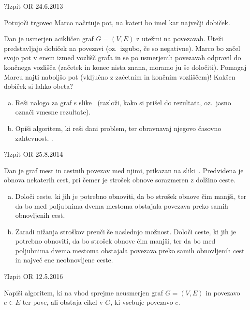 \begin{naloga}{?}{Izpit OR 24.6.2013}
\begin{vprasanje}[marco]
Potujoči trgovec Marco načrtuje pot, na kateri bo imel kar največji dobiček.

Dan je usmerjen acikličen graf $G = (V, E)$ z utežmi na povezavah.
Uteži predstavljajo dobiček na povezavi (oz.~izgubo, če so negativne).
Marco bo začel svojo pot v enem izmed vozlišč grafa
in se po usmerjenih povezavah odpravil do končnega vozlišča
(začetek in konec nista znana, moramo ju še določiti).
Pomagaj Marcu najti naboljšo pot (vključno z začetnim in končnim vozliščem)!
Kakšen dobiček si lahko obeta?

\begin{enumerate}[(a)]
\item Reši nalogo za graf s slike~\fig{}
(razloži, kako si prišel do rezultata, oz.~jasno označi vmesne rezultate).

\item Opiši algoritem, ki reši dani problem,
ter obravnavaj njegovo časovno zahtevnost.
.
\end{enumerate}

\begin{slika}
\pgfslika
{}
\end{slika}
\end{vprasanje}
\begin{odgovor}
\end{odgovor}
\end{naloga}


\begin{naloga}{?}{Izpit OR 25.8.2014}
\begin{vprasanje}[obnova]
Dan je graf mest in cestnih povezav med njimi, prikazan na sliki~\fig{}.
Predvidena je obnova nekaterih cest,
pri čemer je strošek obnove sorazmeren z dolžino ceste.

\begin{enumerate}[(a)]
\item Določi ceste, ki jih je potrebno obnoviti,
da bo strošek obnove čim manjši,
ter da bo med poljubnima dvema mestoma
obstajala povezava preko samih obnovljenih cest.

\item Zaradi nižanja stroškov preuči še naslednjo možnost.
Določi ceste, ki jih je potrebno obnoviti, da bo strošek obnove čim manjši,
ter da bo med poljubnima dvema mestoma obstajala povezava
preko samih obnovljenih cest in največ ene neobnovljene ceste.
\end{enumerate}

\begin{slika}
\pgfslika
{}
\end{slika}
\end{vprasanje}
\begin{odgovor}
\end{odgovor}
\end{naloga}


\begin{naloga}{?}{Izpit OR 12.5.2016}
\begin{vprasanje}[cikel]
Napiši algoritem,
ki na vhod sprejme neusmerjen graf $G = (V, E)$ in povezavo $e \in E$
ter pove, ali obstaja cikel v $G$, ki vsebuje povezavo $e$.
\end{vprasanje}
\begin{odgovor}
\end{odgovor}
\end{naloga}
